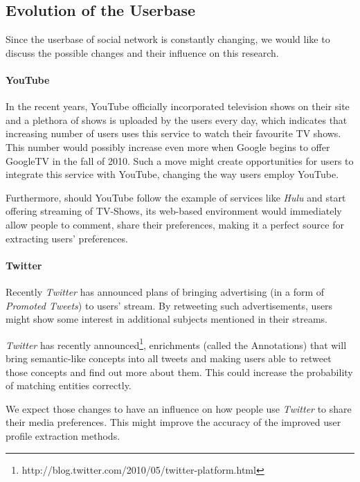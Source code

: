 \subsection{Evolution of the Userbase}

Since the userbase of social network is constantly changing, we would like to
discuss the possible changes and their influence on this research.

\paragraph{YouTube}

In the recent years, YouTube officially incorporated television shows on their
site \cite{youtube-tv-shows} and a plethora of shows is uploaded by the users
every day, which indicates that increasing number of users uses this service to
watch their favourite TV shows. This number would possibly increase even more
when Google begins to offer GoogleTV in the
fall of 2010. Such a move might create opportunities for users to integrate
this service with YouTube, changing the way users employ YouTube.

Furthermore, should YouTube follow the example of services like \textit{Hulu}
and start offering streaming of TV-Shows, its web-based environment would immediately
allow people to comment, share their preferences, making it a perfect source for extracting
users' preferences.

\paragraph{Twitter}

Recently \textit{Twitter} has announced plans of bringing advertising (\eg in a form of
\textit{Promoted Tweets}) to users' stream. By retweeting such advertisements,
users might show some interest in additional subjects mentioned in their
streams.

\textit{Twitter} has recently announced\footnote{http://blog.twitter.com/2010/05/twitter-platform.html},
enrichments (called the Annotations) that will bring semantic-like concepts
into all tweets and making users able to retweet those concepts and find
out more about them. This could increase the probability of matching entities correctly.

We expect those changes to have an influence on how people use \textit{Twitter}
to share their media preferences. This might improve the accuracy of the improved
user profile extraction methods.

